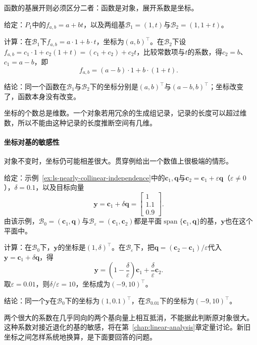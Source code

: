 函数的基展开则必须区分二者：函数是对象，展开系数是坐标。
\begin{example}[仿射函数在两组基下的坐标]
\label{ex:ls-affine-function-coordinates}
给定：$P_1$中的$f_{a,b}=a+bt$，以及两组基$\mathcal B_1=(1,t)$与$\mathcal B_2=(1,1+t)$。

计算：在$\mathcal B_1$下$f_{a,b}=a\cdot1+b\cdot t$，坐标为$(a,b)^\top$。在$\mathcal B_2$下设$f_{a,b}=c_1\cdot1+c_2(1+t)=(c_1+c_2)+c_2t$，比较常数项与$t$的系数，得$c_2=b$、$c_1=a-b$，即
\[
 f_{a,b}=(a-b)\cdot1+b\cdot(1+t).
\]

结论：同一个函数在$\mathcal B_1$与$\mathcal B_2$下的坐标分别是$(a,b)^\top$与$(a-b,b)^\top$；坐标改变了，函数本身没有改变。
\end{example}
坐标的个数总是维数。一个对象若用冗余的生成组记录，记录的长度可以超过维数，所以不能由这种记录的长度推断空间有几维。

\paragraph{坐标对基的敏感性}
对象不变时，坐标仍可能相差很大。贯穿例给出一个数值上很极端的情形。
\begin{example}[近共线基下的大坐标]
\label{ex:ls-coordinate-instability}
给定：示例~\ref{ex:ls-nearly-collinear-independence}中的$\bm c_1,\bm q$与$\bm c_2=\bm c_1+\varepsilon\bm q$（$\varepsilon\neq0$），$\delta=0.1$，以及目标向量
\begin{equation}
 \bm y=\bm c_1+\delta\bm q=\begin{bmatrix}1\\1.1\\0.9\end{bmatrix}.
 \label{eq:linear-algebra-nearly-collinear-target}
\end{equation}
由该示例，$\mathcal B_0=(\bm c_1,\bm q)$与$\mathcal B_\varepsilon=(\bm c_1,\bm c_2)$都是平面$\operatorname{span}\{\bm c_1,\bm q\}$的基，$\bm y$也在这个平面中。

计算：在$\mathcal B_0$下，$\bm y$的坐标是$(1,\delta)^{\top}$。在$\mathcal B_\varepsilon$下，把$\bm q=(\bm c_2-\bm c_1)/\varepsilon$代入$\bm y=\bm c_1+\delta\bm q$，得
\begin{equation}
 \bm y=\left(1-\frac{\delta}{\varepsilon}\right)\bm c_1
       +\frac{\delta}{\varepsilon}\bm c_2.
 \label{eq:linear-algebra-coordinate-instability}
\end{equation}
取$\varepsilon=0.01$，则$\delta/\varepsilon=10$，坐标成为$(-9,10)^{\top}$。

结论：同一个$\bm y$在$\mathcal B_0$下的坐标为$(1,0.1)^\top$，在$\mathcal B_{0.01}$下的坐标为$(-9,10)^\top$。
\end{example}
两个很大的系数在几乎同向的两个基向量上相互抵消，不能据此判断原对象很大。这种系数对接近退化的基的敏感，将在第~\ref{chap:linear-analysis}章定量讨论。新旧坐标之间怎样系统地换算，是下面要回答的问题。

